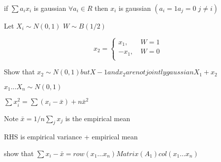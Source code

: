 




\MakeScribeTop

if $\sum a_i x_i$ is gaussian $\forall a_i \in R$ then $x_i$ is gaussian $(a_i =1 a_j =0 \; j \neq i) $

Let $X_i \sim N(0,1)$
$W \sim B(1/2)$

  \begin{equation}
    x_2=
    \begin{cases}
      x_1, & \ W=1 \\
      -x_1, & \ W=0 \\
    \end{cases}
  \end{equation}

Show that $x_2 \sim N(0,1) but X-1 and x_2 are not jointly gaussian X_1 + x_2$


$x_1... X_n  \sim N(0,1)$

$\sum x_i^2 = \sum(x_i-\bar{x})+ n \bar{x}^2$

Note $\bar{x} = 1/n \sum_j x_j$ is the empirical mean

RHS is empirical variance + empirical mean

show that $\sum x_i - \bar{x}=row(x_1...x_n)Matrix(A_1)col(x_1...x_n)$
